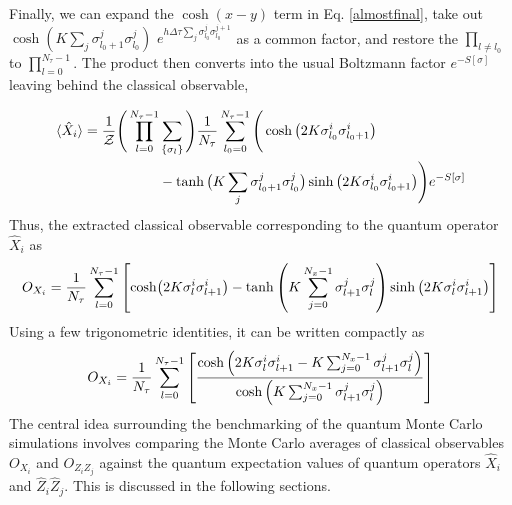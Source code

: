 \documentclass[../thesis_main.tex]{subfiles}
\begin{document}
Finally, we can expand the $\cosh(x-y)$ term in Eq. \eqref{almostfinal}, take out $\cosh(K \sum_j \sigma^j_{l_0+1} \sigma^j_{l_0})$ $e^{ h \Delta \tau  \sum_j \sigma^j_{l_0} \sigma^{j+1}_{l_0}}$ as a common factor, and restore the $\displaystyle \prod_{l \neq l_0}$ to $\displaystyle\prod_{l = 0}^{N_\tau - 1}$. The product then converts into the usual Boltzmann factor $e^{-S[\sigma]}$ leaving behind the classical observable,

\begin{align}
    \langle \hat{X}_i \rangle = \frac{1}{\mathcal{Z}} \Bigg(\prod_{l=0}^{N_\tau - 1}& \sum_{\{\sigma_l \}}\Bigg) \frac{1}{N_\tau} \sum_{l_0 = 0}^{N_\tau - 1} \Bigg(\cosh\big(2K \sigma^{i}_{l_0} \sigma^{i}_{l_0 + 1}\big) \nonumber \\
    &-\tanh\big(K \sum_j \sigma^j_{l_0+1} \sigma^j_{l_0}\big) \sinh\qty(2K \sigma^{i}_{l_0} \sigma^{i}_{l_0 + 1}) \Bigg)e^{-S[\sigma]}
\end{align}
Thus, the extracted classical observable corresponding to the quantum operator $\hat{X}_i$ as
\begin{equation}
        O_{{X}_i} = \frac{1}{N_\tau} \sum_{l=0}^{N_\tau -1} \qty[\cosh(2K\sigma^{i}_{l} \sigma^{i}_{l + 1}) - \tanh\qty(K \sum_{j=0}^{N_x-1} \sigma^j_{l+1} \sigma^j_{l}) \sinh\qty(2K \sigma^{i}_{l} \sigma^{i}_{l + 1})]
     \label{classicalxi_1}
\end{equation} 
Using a few trigonometric identities, it can be written compactly as 
\begin{equation}
        O_{{X}_i} = \frac{1}{N_\tau} \sum_{l=0}^{N_\tau -1} \qty[\frac{\cosh\qty(2K\sigma^{i}_{l} \sigma^{i}_{l + 1} - K \sum_{j=0}^{N_x-1} \sigma^j_{l+1} \sigma^j_{l})}{\cosh\qty(K \sum_{j=0}^{N_x-1} \sigma^j_{l+1} \sigma^j_{l})}]
    \label{classicalxi_2}
\end{equation}
The central idea surrounding the benchmarking of the quantum Monte Carlo simulations involves comparing the Monte Carlo averages of classical observables $O_{X_i}$ and $O_{Z_i Z_j}$ against the quantum expectation values of quantum operators $\hat{X}_i$ and $\hat{Z}_i \hat{Z}_j$. This is discussed in the following sections.   

\end{document}
